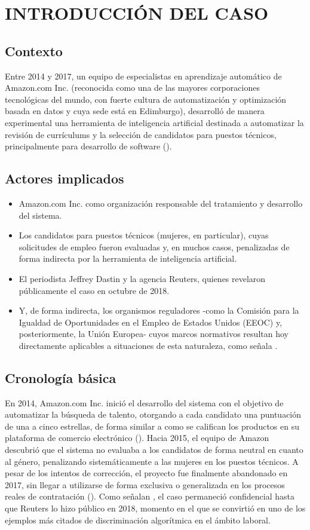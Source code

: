 \chapter{INTRODUCCIÓN DEL CASO}

\section{Contexto}
Entre 2014 y 2017, un equipo de especialistas en aprendizaje automático de Amazon.com Inc. (reconocida como una de las mayores corporaciones tecnológicas del mundo, con fuerte cultura de automatización y optimización basada en datos y cuya sede está en Edimburgo), desarrolló de manera experimental una herramienta de inteligencia artificial destinada a automatizar la revisión de currículums y la selección de candidatos para puestos técnicos, principalmente para desarrollo de software (\textcite{dastin2018}).

\section{Actores implicados}
\begin{itemize}
    \item Amazon.com Inc. como organización responsable del tratamiento y desarrollo del sistema.
    \item Los candidatos para puestos técnicos (mujeres, en particular), cuyas solicitudes de empleo fueron evaluadas y, en muchos casos, penalizadas de forma indirecta por la herramienta de inteligencia artificial.
    \item El periodista Jeffrey Dastin y la agencia Reuters, quienes revelaron públicamente el caso en octubre de 2018.
    \item Y, de forma indirecta, los organismos reguladores -como la Comisión para la Igualdad de Oportunidades en el Empleo de Estados Unidos (EEOC) y, posteriormente, la Unión Europea- cuyos marcos normativos resultan hoy directamente aplicables a situaciones de esta naturaleza, como señala \textcite{chen2023}.
\end{itemize}

\section{Cronología básica}
En 2014, Amazon.com Inc. inició el desarrollo del sistema con el objetivo de automatizar la búsqueda de talento, otorgando a cada candidato una puntuación de una a cinco estrellas, de forma similar a como se califican los productos en su plataforma de comercio electrónico (\textcite{dastin2018}). Hacia 2015, el equipo de Amazon descubrió que el sistema no evaluaba a los candidatos de forma neutral en cuanto al género, penalizando sistemáticamente a las mujeres en los puestos técnicos. A pesar de los intentos de corrección, el proyecto fue finalmente abandonado en 2017, sin llegar a utilizarse de forma exclusiva o generalizada en los procesos reales de contratación (\textcite{infobae2018}). Como señalan \textcite{chen2023,kochling2020}, el caso permaneció confidencial hasta que Reuters lo hizo público en 2018, momento en el que se convirtió en uno de los ejemplos más citados de discriminación algorítmica en el ámbito laboral.
